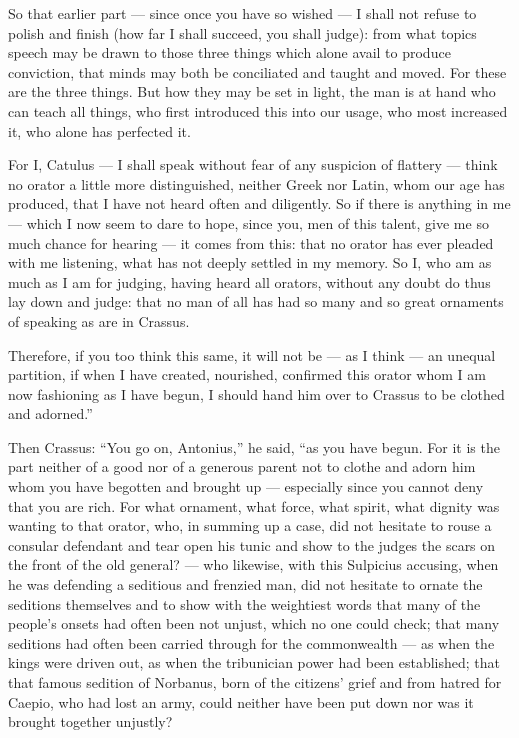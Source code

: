  So that earlier part — since once you have so wished — I shall not refuse to polish and finish (how far I shall succeed, you shall judge): from what topics speech may be drawn to those three things which alone avail to produce conviction, that minds may both be conciliated and taught and moved. For these are the three things. But how they may be set in light, the man is at hand who can teach all things, who first introduced this into our usage, who most increased it, who alone has perfected it.

 For I, Catulus — I shall speak without fear of any suspicion of flattery — think no orator a little more distinguished, neither Greek nor Latin, whom our age has produced, that I have not heard often and diligently. So if there is anything in me — which I now seem to dare to hope, since you, men of this talent, give me so much chance for hearing — it comes from this: that no orator has ever pleaded with me listening, what has not deeply settled in my memory. So I, who am as much as I am for judging, having heard all orators, without any doubt do thus lay down and judge: that no man of all has had so many and so great ornaments of speaking as are in Crassus.

 Therefore, if you too think this same, it will not be — as I think — an unequal partition, if when I have created, nourished, confirmed this orator whom I am now fashioning as I have begun, I should hand him over to Crassus to be clothed and adorned.''

 Then Crassus: ``You go on, Antonius,'' he said, ``as you have begun. For it is the part neither of a good nor of a generous parent not to clothe and adorn him whom you have begotten and brought up — especially since you cannot deny that you are rich. For what ornament, what force, what spirit, what dignity was wanting to that orator, who, in summing up a case, did not hesitate to rouse a consular defendant and tear open his tunic and show to the judges the scars on the front of the old general? — who likewise, with this Sulpicius accusing, when he was defending a seditious and frenzied man, did not hesitate to ornate the seditions themselves and to show with the weightiest words that many of the people's onsets had often been not unjust, which no one could check; that many seditions had often been carried through for the commonwealth — as when the kings were driven out, as when the tribunician power had been established; that that famous sedition of Norbanus, born of the citizens' grief and from hatred for Caepio, who had lost an army, could neither have been put down nor was it brought together unjustly?

